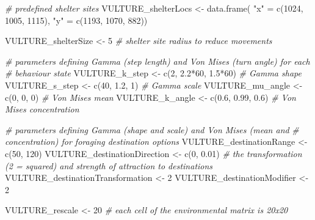 \documentclass[10pt,a4paper]{article}
\newenvironment{Shaded}{}{}
\newcommand{\CommentTok}[1]{\textit{#1}}
\newcommand{\DecValTok}[1]{#1}
\newcommand{\FloatTok}[1]{#1}
\newcommand{\FunctionTok}[1]{#1}
\newcommand{\NormalTok}[1]{#1}
\newcommand{\OtherTok}[1]{#1}
\newcommand{\SpecialCharTok}[1]{#1}
\newcommand{\StringTok}[1]{#1}
\begin{document}
\begin{Shaded}
\begin{Highlighting}[]
\CommentTok{\# predefined shelter sites}
\NormalTok{VULTURE\_shelterLocs }\OtherTok{\textless{}{-}} \FunctionTok{data.frame}\NormalTok{(}
  \StringTok{"x"} \OtherTok{=} \FunctionTok{c}\NormalTok{(}\DecValTok{1024}\NormalTok{, }\DecValTok{1005}\NormalTok{, }\DecValTok{1115}\NormalTok{),}
  \StringTok{"y"} \OtherTok{=} \FunctionTok{c}\NormalTok{(}\DecValTok{1193}\NormalTok{, }\DecValTok{1070}\NormalTok{, }\DecValTok{882}\NormalTok{))}

\NormalTok{VULTURE\_shelterSize }\OtherTok{\textless{}{-}} \DecValTok{5} \CommentTok{\# shelter site radius to reduce movements}

\CommentTok{\# parameters defining Gamma (step length) and Von Mises (turn angle) for each}
\CommentTok{\# behaviour state}
\NormalTok{VULTURE\_k\_step }\OtherTok{\textless{}{-}} \FunctionTok{c}\NormalTok{(}\DecValTok{2}\NormalTok{, }\FloatTok{2.2}\SpecialCharTok{*}\DecValTok{60}\NormalTok{, }\FloatTok{1.5}\SpecialCharTok{*}\DecValTok{60}\NormalTok{) }\CommentTok{\# Gamma shape}
\NormalTok{VULTURE\_s\_step }\OtherTok{\textless{}{-}} \FunctionTok{c}\NormalTok{(}\DecValTok{40}\NormalTok{, }\FloatTok{1.2}\NormalTok{, }\DecValTok{1}\NormalTok{) }\CommentTok{\# Gamma scale}
\NormalTok{VULTURE\_mu\_angle }\OtherTok{\textless{}{-}} \FunctionTok{c}\NormalTok{(}\DecValTok{0}\NormalTok{, }\DecValTok{0}\NormalTok{, }\DecValTok{0}\NormalTok{) }\CommentTok{\# Von Mises mean}
\NormalTok{VULTURE\_k\_angle }\OtherTok{\textless{}{-}} \FunctionTok{c}\NormalTok{(}\FloatTok{0.6}\NormalTok{, }\FloatTok{0.99}\NormalTok{, }\FloatTok{0.6}\NormalTok{) }\CommentTok{\# Von Mises concentration}

\CommentTok{\# parameters defining Gamma (shape and scale) and Von Mises (mean and}
\CommentTok{\# concentration) for foraging destination options}
\NormalTok{VULTURE\_destinationRange }\OtherTok{\textless{}{-}} \FunctionTok{c}\NormalTok{(}\DecValTok{50}\NormalTok{, }\DecValTok{120}\NormalTok{)}
\NormalTok{VULTURE\_destinationDirection }\OtherTok{\textless{}{-}} \FunctionTok{c}\NormalTok{(}\DecValTok{0}\NormalTok{, }\FloatTok{0.01}\NormalTok{)}
\CommentTok{\# the transformation (2 = squared) and strength of attraction to destinations}
\NormalTok{VULTURE\_destinationTransformation }\OtherTok{\textless{}{-}} \DecValTok{2}
\NormalTok{VULTURE\_destinationModifier }\OtherTok{\textless{}{-}} \DecValTok{2}

\NormalTok{VULTURE\_rescale }\OtherTok{\textless{}{-}} \DecValTok{20} \CommentTok{\# each cell of the environmental matrix is 20x20}


\end{Highlighting}
\end{Shaded}
\end{document}

